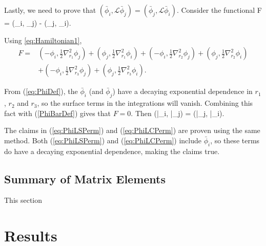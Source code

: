 \documentclass[Dissertation.tex]{subfiles}
\begin{document}
Lastly, we need to prove that $\left(\bar{\phi}_i, \mathcal{L} \bar{\phi}_j\right) = \left(\bar{\phi}_j, \mathcal{L} \bar{\phi}_i\right)$. Consider the functional
\beq
F = (\phi_i,  \phi_j) - (\phi_j,  \phi_i).
\eeq

Using \cref{eq:Hamiltonian1},
\begin{align}
	F=&\left({-\phi_i,{\frac {1}{2}{\nabla }_{{r}_{1}}^{2}\phi_j}}\right)+\left({\phi_j,{\frac {1}{2}{\nabla }_{{r}_{1}}^{2}\phi_i}}\right)+
	\left({-\phi_i,{\frac {1}{2}{\nabla }_{{r}_{2}}^{2}\phi_j}}\right)+\left({\phi_j,{\frac {1}{2}{\nabla }_{{r}_{2}}^{2}\phi_i}}\right) \nonumber \\
	&+\left({-\phi_i,{\frac {1}{2}{\nabla }_{{r}_{3}}^{2}\phi_j}}\right)+\left({\phi_j,{\frac {1}{2}{\nabla }_{{r}_{3}}^{2}\phi_i}}\right).
\end{align}

From (\ref{eq:PhiDef}), the $\bar{\phi}_i$ (and $\bar{\phi}_j$) have a decaying exponential dependence in $r_1$, $r_2$ and $r_3$, so the surface terms in the integrations will vanish.  Combining this fact with (\ref{PhiBarDef}) gives that $F = 0$. Then
\beq
\left(\bar{\phi}_i,  \bar{\phi}_j\right) = \left(\bar{\phi}_j,  \bar{\phi}_i\right).
\label{PhiLPhiPerm}
\eeq

The claims in (\ref{eq:PhiLSPerm}) and (\ref{eq:PhiLCPerm}) are proven using the same method. Both (\ref{eq:PhiLSPerm}) and (\ref{eq:PhiLCPerm}) include $\bar{\phi}_i$, so these terms do have a decaying exponential dependence, making the claims true.







\subsection{Summary of Matrix Elements}
\label{SWaveMatrixSummary}
This section 



\section{Results}
\end{document}
